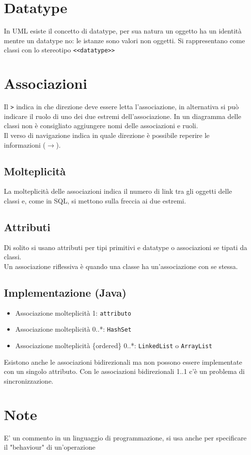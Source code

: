 \documentclass[12pt, a4paper]{report}
\begin{document}
\section{Datatype}
In UML esiste il concetto di datatype, per sua natura un oggetto ha un identità mentre un datatype no: le istanze sono valori non oggetti. Si rappresentano come classi con lo stereotipo \texttt{<<datatype>>}
\section{Associazioni}
Il \texttt{>} indica in che direzione deve essere letta l'associazione, in alternativa si può indicare il ruolo di uno dei due estremi dell'associazione. In un diagramma delle classi non è consigliato aggiungere nomi delle associazioni e ruoli. \\
Il verso di navigazione indica in quale direzione è possibile reperire le informazioni ($\rightarrow$).
\subsection{Molteplicità}
La molteplicità delle associazioni indica il numero di link tra gli oggetti delle classi e, come in SQL, si mettono sulla freccia ai due estremi.
\subsection{Attributi}
Di solito si usano attributi per tipi primitivi e datatype o associazioni se tipati da classi.\\
Un associazione riflessiva è quando una classe ha un'associazione con se stessa.
\subsection{Implementazione (Java)}
\begin{itemize}
    \item Associazione molteplicità 1: \texttt{attributo}
    \item Associazione molteplicità 0..*: \texttt{HashSet}
    \item Associazione molteplicità \{ordered\} 0..*: \texttt{LinkedList} o \texttt{ArrayList}
\end{itemize}
Esistono anche le associazioni bidirezionali ma non possono essere implementate con un singolo attributo. Con le associazioni bidirezionali 1..1 c'è un problema di sincronizzazione.
\section{Note}
E' un commento in un linguaggio di programmazione, si usa anche per specificare il "behaviour" di un'operazione
\end{document}
